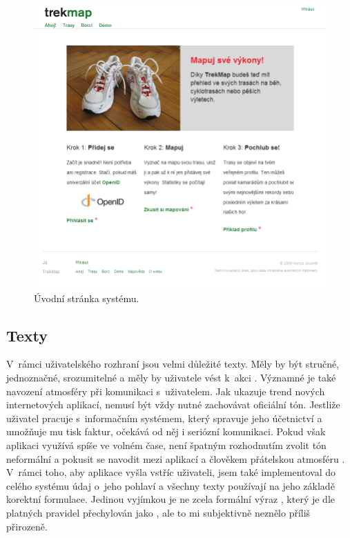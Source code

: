 \begin{figure}[h]
	\includegraphics[width=\textwidth, keepaspectratio]{fig/screentexty}
	\caption{Úvodní stránka systému.}
	\label{obrTexty}
\end{figure}

\subsection{Texty}
V~rámci uživatelského rozhraní jsou velmi důležité texty. Měly by být
stručné, jednoznačné, srozumitelné a měly by uživatele vést k~akci
\cite{ui}. Významné je také navození atmosféry při komunikaci
s~uživatelem. Jak ukazuje trend nových internetových aplikací, nemusí
být vždy nutné zachovávat oficiální tón. Jestliže uživatel pracuje
s~informačním systémem, který spravuje jeho účetnictví a umožňuje mu
tisk faktur, očekává od něj i seriózní komunikaci. Pokud však
aplikaci využívá spíše ve volném čase, není špatným rozhodnutím
zvolit tón neformální a pokusit se navodit mezi aplikací a člověkem
přátelskou atmosféru \cite{informalTone}. V~rámci toho, aby aplikace
vyšla vstříc uživateli, jsem také implementoval do celého systému
údaj o~jeho pohlaví a všechny texty používají na jeho základě
korektní formulace. Jedinou vyjímkou je ne zcela formální výraz
, který je dle platných pravidel přechylován jako
, ale to mi subjektivně neznělo příliš přirozeně. 

